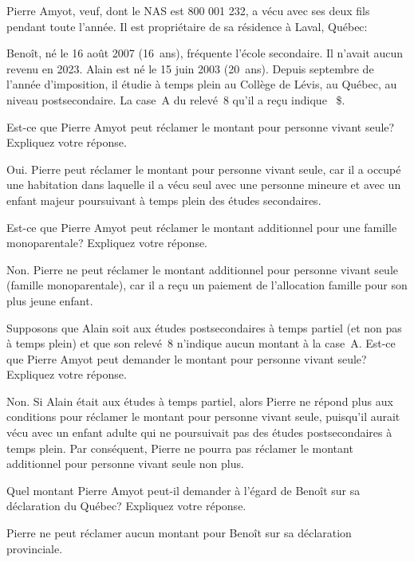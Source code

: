 \begin{question}
	Pierre Amyot, veuf, dont le NAS est 800 001 232, a vécu avec ses deux fils pendant toute l'année. Il est propriétaire de sa résidence à Laval, Québec:
	
	Benoît, né le 16 août 2007 (16~ans), fréquente l'école secondaire. Il n'avait aucun revenu en 2023.
	Alain est né le 15 juin 2003 (20~ans). Depuis septembre de l'année d'imposition, il étudie à temps plein au Collège de Lévis, au Québec, au niveau postsecondaire. La case~A du relevé~8 qu'il a reçu indique
	~\$.
	
\end{question}
\setcounter{sousQuestion}{0}
\begin{sousQuestion}
	Est-ce que Pierre Amyot peut réclamer le montant pour personne vivant seule? Expliquez votre réponse.
\end{sousQuestion}
Oui. Pierre peut réclamer le montant pour personne vivant seule, car il a occupé une habitation dans laquelle il a vécu seul avec une personne mineure et avec un enfant majeur poursuivant à temps plein des études secondaires.

\begin{sousQuestion}
	Est-ce que Pierre Amyot peut réclamer le montant additionnel pour une famille monoparentale? Expliquez votre réponse.
\end{sousQuestion}
Non. Pierre ne peut réclamer le montant additionnel pour personne vivant seule (famille monoparentale), car il a reçu un paiement de l'allocation famille pour son plus jeune enfant.

\begin{sousQuestion}
	Supposons que Alain soit aux études postsecondaires à temps partiel (et non pas à temps plein) et que son relevé~8 n'indique aucun montant à la case~A. Est-ce que Pierre Amyot peut demander le montant pour personne vivant seule? Expliquez votre réponse.
\end{sousQuestion}
Non. Si Alain était aux études à temps partiel, alors Pierre ne répond plus aux conditions pour réclamer le montant pour personne vivant seule, puisqu'il aurait vécu avec un enfant adulte qui ne poursuivait pas des études postsecondaires à temps plein. Par conséquent, Pierre ne pourra pas réclamer le montant additionnel pour personne vivant seule non plus.

\begin{sousQuestion}
	Quel montant Pierre Amyot peut-il demander à l'égard de Benoît sur sa déclaration du Québec? Expliquez votre réponse.
\end{sousQuestion}
Pierre ne peut réclamer aucun montant pour Benoît sur sa déclaration provinciale.

